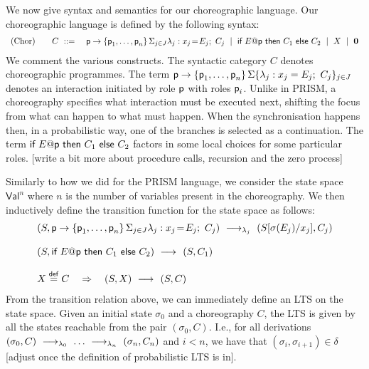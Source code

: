 We now give syntax and semantics for our choreographic language.
%
 Our choreographic language is defined by the following
syntax:
%
\begin{displaymath}
  \begin{array}{lll}
    \text{(Chor)}
    \quad & C \ ::=\
    &
      \textsf{p}\rightarrow \{\textsf{p}_1,\ldots,\textsf{p}_n\}\,\Sigma_{j\in J} \lambda_j: x_j\!=\!E_j;\ C_j
      \ \mid\
      \textsf{if } E@\textsf{p} \textsf{ then } {C_1} \textsf{ else } {C_2}
      \ \mid\
      X
      \ \mid\
      \mathbf{0}
  \end{array}
\end{displaymath}
We comment the various constructs. The syntactic category $C$ denotes
choreographic programmes. The term
$\textsf{p}\rightarrow \{\textsf{p}_1,\ldots,\textsf{p}_n\}\,\Sigma\{\lambda_j:
x_j=E_j;\ C_j\}_{j\in J}$ denotes an interaction initiated by role
$\textsf{p}$ with roles $\textsf{p}_i$. Unlike in PRISM, a choreography
specifies what interaction must be executed next, shifting the focus
from what can happen to what must happen. When the synchronisation
happens then, in a probabilistic way, one of the branches is selected
as a continuation. The term
$\textsf{if } E@\textsf{p} \textsf{ then } C_1 \textsf{
  else } C_2$ factors in some local choices for some particular
roles. [write a bit more about procedure calls, recursion and the zero
process]

\mypar{Semantics.} Similarly to how we did for the PRISM language, we
consider the state space $\mathsf{Val}^n$ where $n$ is the number of
variables present in the choreography. We then inductively define the
transition function for the state space as follows: 
\begin{displaymath}
  \begin{array}{lllll}
    (S, \textsf{p}\rightarrow \{\textsf{p}_1,\ldots,\textsf{p}_n\}\,\Sigma_{j\in J} \lambda_j: x_j\!=\!E_j;\ C_j) 
    \ \longrightarrow_{\lambda_j}\ 
    (S[\sigma(E_j)/x_j], C_j) 
    \\\\
    (S,\textsf{if } E@\textsf{p} \textsf{ then } {C_1} \textsf{ else } {C_2}) 
    \ \longrightarrow_{}\ 
    (S, C_1)
    \\\\
    X\stackrel{\mathsf{def}}{=} C \quad\Rightarrow\quad (S, X) \ \longrightarrow_{}\ (S,C)
  \end{array}
\end{displaymath}
From the transition relation above, we can immediately define an LTS
on the state space. Given an initial state $\sigma_0$ and a
choreography $C$, the LTS is given by all the states reachable from
the pair $(\sigma_0,C)$. I.e., for all derivations
$(\sigma_0,C)\ \longrightarrow_{\lambda_0}\ \ldots\ \longrightarrow_{\lambda_n}\ (\sigma_n, C_n)$ and
$i<n$, we have that $(\sigma_i,\sigma_{i+1})\in\delta$ [adjust once
the definition of probabilistic LTS is in].




